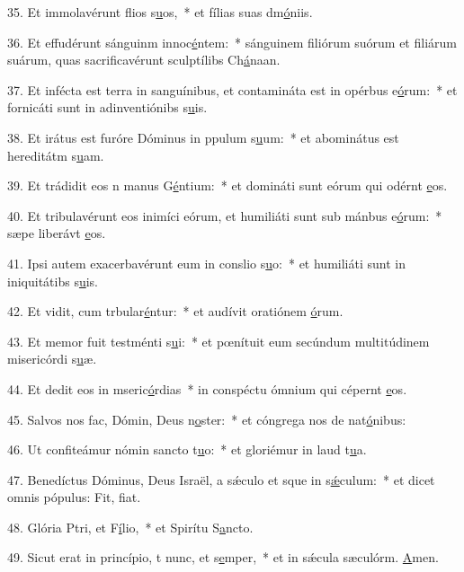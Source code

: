 35. Et immolavérunt flios s\uline{u}os,~* et fílias suas dm\uline{ó}niis.\par 
36. Et effudérunt sánguinm innoc\uline{é}ntem:~* sánguinem filiórum suórum et filiárum suárum, quas sacrificavérunt sculptílibs Ch\uline{á}naan.\par 
37. Et infécta est terra in sanguínibus, et contamináta est in opérbus e\uline{ó}rum:~* et fornicáti sunt in adinventiónibs s\uline{u}is.\par 
38. Et irátus est furóre Dóminus in ppulum s\uline{u}um:~* et abominátus est hereditátm s\uline{u}am.\par 
39. Et trádidit eos n manus G\uline{é}ntium:~* et domináti sunt eórum qui odérnt \uline{e}os.\par 
40. Et tribulavérunt eos inimíci eórum, et humiliáti sunt sub mánbus e\uline{ó}rum:~* sæpe liberávt \uline{e}os.\par 
41. Ipsi autem exacerbavérunt eum in conslio s\uline{u}o:~* et humiliáti sunt in iniquitátibs s\uline{u}is.\par 
42. Et vidit, cum trbular\uline{é}ntur:~* et audívit oratiónem \uline{ó}rum.\par 
43. Et memor fuit testménti s\uline{u}i:~* et pœnítuit eum secúndum multitúdinem misericórdi s\uline{u}æ.\par 
44. Et dedit eos in mseric\uline{ó}rdias~* in conspéctu ómnium qui cépernt \uline{e}os.\par 
45. Salvos nos fac, Dómin, Deus n\uline{o}ster:~* et cóngrega nos de nat\uline{ó}nibus:\par 
46. Ut confiteámur nómin sancto t\uline{u}o:~* et gloriémur in laud t\uline{u}a.\par 
47. Benedíctus Dóminus, Deus Israël, a sǽculo et sque in s\uline{ǽ}culum:~* et dicet omnis pópulus: Fit, f\uline{i}at.\par 
48. Glória Ptri, et F\uline{í}lio,~* et Spirítu S\uline{a}ncto.\par 
49. Sicut erat in princípio, t nunc, et s\uline{e}mper,~* et in sǽcula sæculórm. \uline{A}men.\par 

